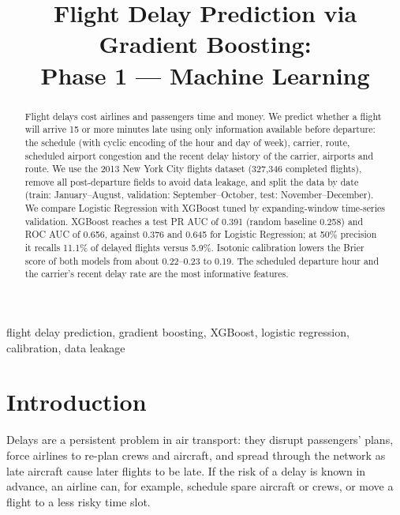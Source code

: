 \documentclass[conference]{IEEEtran}
\begin{document}
\title{Flight Delay Prediction via Gradient Boosting:\\Phase 1 --- Machine Learning}

\author{
}

\maketitle

\begin{abstract}
Flight delays cost airlines and passengers time and money. We predict whether a flight will arrive 15 or more
minutes late using only information available before departure: the schedule (with cyclic encoding of the hour
and day of week), carrier, route, scheduled airport congestion and the recent delay history of the carrier,
airports and route. We use the 2013 New York City flights
dataset (327{,}346 completed flights), remove all post-departure fields to avoid data leakage, and split the data
by date (train: January--August, validation: September--October, test: November--December). We compare Logistic
Regression with XGBoost tuned by expanding-window time-series validation. XGBoost reaches a test PR AUC of 0.391
(random baseline 0.258) and ROC AUC of 0.656, against 0.376 and 0.645 for Logistic Regression; at 50\% precision
it recalls 11.1\% of delayed flights versus 5.9\%. Isotonic calibration lowers the Brier score of both models from
about 0.22--0.23 to 0.19. The scheduled departure hour and the carrier's recent delay rate are the most informative
features.
\end{abstract}

\begin{IEEEkeywords}
flight delay prediction, gradient boosting, XGBoost, logistic regression, calibration, data leakage
\end{IEEEkeywords}

\section{Introduction}
Delays are a persistent problem in air transport: they disrupt passengers' plans, force airlines to re-plan crews
and aircraft, and spread through the network as late aircraft cause later flights to be late. If the risk of a
delay is known in advance, an airline can, for example, schedule spare aircraft or crews, or move a flight to a
less risky time slot.
\end{document}

